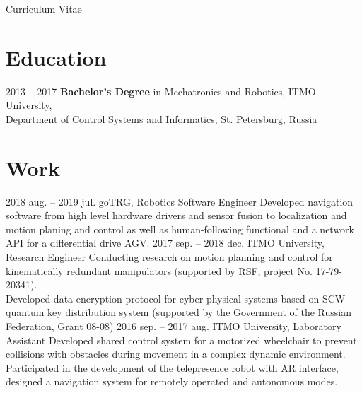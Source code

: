 \documentclass{ncv}
\begin{document}
\begin{center}
    {\Huge Curriculum Vitae}
\end{center}

\vspace{1cm}

\header

\section{Education}
\begin{two_col_entry_list}
	\entry
		{2013 -- 2017}
		{\textbf{Bachelor's Degree} in Mechatronics and Robotics, ITMO University, \\ Department of Control Systems and Informatics, St. Petersburg, Russia}
\end{two_col_entry_list}


\section{Work}
\begin{two_col_entry_list}
    \entryh
		{2018 aug. -- 2019 jul.}
		{goTRG, Robotics Software Engineer}
		{}
		{Developed navigation software from high level hardware drivers and sensor fusion to localization and motion planing and control as well as human-following functional and a network API for a differential drive AGV.
		}
    \entryh
		{2017 sep. -- 2018 dec.}
		{ITMO University, Research Engineer}
		{}
		{Conducting research on motion planning and control for kinematically redundant manipulators (supported by RSF, project No. 17-79-20341).\\[1mm] 
		Developed data encryption protocol for cyber-physical systems based on SCW quantum key distribution system (supported by the Government of the Russian Federation, Grant 08-08) 
		}
	\entryh
		{2016 sep. -- 2017 aug.}
		{ITMO University, Laboratory Assistant}
		{}
		{Developed shared control system for a motorized wheelchair to  prevent collisions with obstacles during movement in a complex dynamic environment.\\[1mm]
		Participated in the development of the telepresence robot with AR interface, designed a navigation system for remotely operated and autonomous modes.}
\end{two_col_entry_list}
\end{document}

